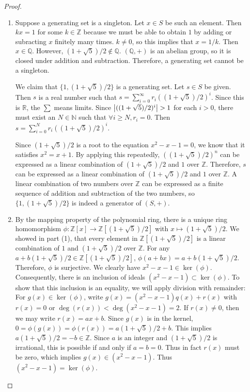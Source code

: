 \documentclass[12pt, psamsfonts]{amsart}
\theoremstyle{definition}
\theoremstyle{remark}
\numberwithin{equation}{section}
\begin{document}
\begin{proof}
  $ $
  \begin{enumerate}
    \item 
      Suppose a generating set is a singleton.
      Let $x \in S$ be such an element.
      Then $kx = 1$ for some $k \in \mathbb{Z}$ because we must be able to obtain $1$ by adding or subracting $x$ finitely many times.
      $k \ne 0$, so this implies that $x = 1 / k$.
      Then $x \in \mathbb{Q}$.
      However, $(1 + \sqrt{5}) / 2 \notin \mathbb{Q}$.
      $(\mathbb{Q}, +)$ is an abelian group, so it is closed under addition and subtraction.
      Therefore, a generating set cannot be a singleton.

      We claim that $\{ 1, (1 + \sqrt{5}) / 2 \}$ is a generating set.
      Let $s \in S$ be given.
      Then $s$ is a real number such that $s = \sum_{i=0}^{\infty} r_i((1 + \sqrt{5}) / 2)^i$.
      Since this is $\mathbb{R}$, the $\sum$ means limits.
      Since $\abs{((1 + \sqrt{5}) / 2)^i} > 1$ for each $i > 0$, there must exist an $N \in \mathbb{N}$ such that $\forall i \geq N, r_i = 0$.
      Then $s = \sum_{i=0}^{N} r_i((1 + \sqrt{5}) / 2)^i$.

      Since $(1 + \sqrt{5}) / 2$ is a root to the equation $x^2 - x - 1 = 0$, we know that it satisfies $x^2 = x + 1$.
      By applying this repeatedly, $((1 + \sqrt{5}) / 2)^n$ can be expressed as a linear combination of $(1 + \sqrt{5}) / 2$ and $1$ over $\mathbb{Z}$.
      Therefore, $s$ can be expressed as a linear combination of $(1 + \sqrt{5}) / 2$ and $1$ over $\mathbb{Z}$.
      A linear combination of two numbers over $\mathbb{Z}$ can be expressed as a finite sequence of addition and subtraction of the two numbers, so $\{ 1, (1 + \sqrt{5}) / 2 \}$ is indeed a generator of $(S, +)$.
    \item
      By the mapping property of the polynomial ring, there is a unique ring homomorphism $\phi: \mathbb{Z}[x] \rightarrow \mathbb{Z}[(1 + \sqrt{5}) / 2]$ with $x \mapsto (1 + \sqrt{5}) / 2$.
      We showed in part (1), that every element in $\mathbb{Z}[(1 + \sqrt{5}) / 2]$ is a linear combination of $1$ and $(1 + \sqrt{5}) / 2$ over $\mathbb{Z}$.
      For any $a + b(1 + \sqrt{5}) / 2 \in \mathbb{Z}[(1 + \sqrt{5}) / 2]$, $\phi(a + bx) = a + b(1 + \sqrt{5}) / 2$.
      Therefore, $\phi$ is surjective.
      We clearly have $x^2 - x - 1 \in \ker(\phi)$.
      Consequently, there is an inclusion of ideals $(x^2 - x - 1) \subset \ker(\phi)$.
      To show that this inclusion is an equality, we will apply division with remainder:
      For $g(x) \in \ker(\phi)$, write $g(x) = (x^2 - x - 1)q(x) + r(x)$ with $r(x) = 0$ or $\deg(r(x)) < \deg(x^2 - x - 1) = 2$.
      If $r(x) \ne 0$, then we may write $r(x) = ax + b$.
      Since $g(x)$ is in the kernel, $0 = \phi(g(x)) = \phi(r(x)) = a(1 + \sqrt{5})/2 + b$.
      This implies $a(1 + \sqrt{5}) / 2 = -b \in \mathbb{Z}$.
      Since $a$ is an integer and $(1 + \sqrt{5}) / 2$ is irrational, this is possible if and only if $a = b = 0$.
      Thus in fact $r(x)$ must be zero, which implies $g(x) \in (x^2 - x - 1)$.
      Thus $(x^2 - x - 1) = \ker(\phi)$.


\end{enumerate}
\end{proof}
\end{document}
